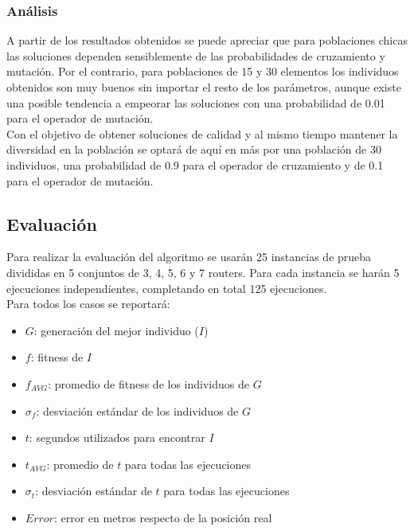 \documentclass[journal]{IEEEtran}
\begin{document}

\subsubsection*{Análisis}

A partir de los resultados obtenidos se puede apreciar que para poblaciones chicas las soluciones dependen sensiblemente de las probabilidades de cruzamiento y mutación. Por el contrario, para poblaciones de 15 y 30 elementos los individuos obtenidos son muy buenos sin importar el resto de los parámetros, aunque existe una posible tendencia a empeorar las soluciones con una probabilidad de 0.01 para el operador de mutación.\\

Con el objetivo de obtener soluciones de calidad y al mismo tiempo mantener la diversidad en la población se optará de aquí en más por una población de 30 individuos, una probabilidad de 0.9 para el operador de cruzamiento y de 0.1 para el operador de mutación.

\subsection{Evaluación}

Para realizar la evaluación del algoritmo se usarán 25 instancias de prueba divididas en 5 conjuntos de 3, 4, 5, 6 y 7 routers. Para cada instancia se harán 5 ejecuciones independientes, completando en total 125 ejecuciones.\\


Para todos los casos se reportará:\\

\begin{itemize}
\item $G$: generación del mejor individuo ($I$)
\item $f$: fitness de $I$
\item $f_{AVG}$: promedio de fitness de los individuos de $G$
\item $\sigma_f$: desviación estándar de los individuos de $G$
\item $t$: segundos utilizados para encontrar $I$
\item $t_{AVG}$: promedio de $t$ para todas las ejecuciones
\item $\sigma_t$: desviación estándar de $t$ para todas las ejecuciones
\item $Error$: error en metros respecto de la posición real
\end{itemize}
\end{document}
